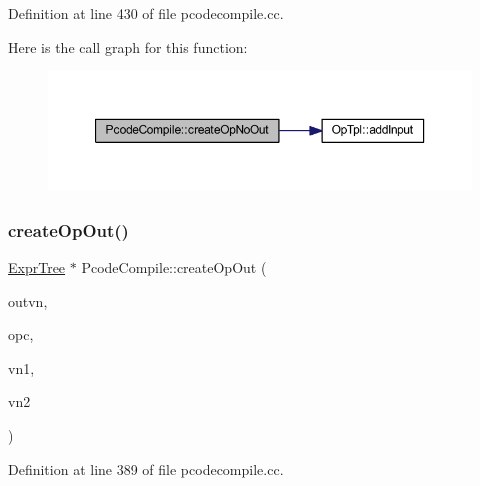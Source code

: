 Definition at line 430 of file pcodecompile.\+cc.

Here is the call graph for this function\+:
\nopagebreak
\begin{figure}[H]
\begin{center}
\leavevmode
\includegraphics[width=350pt]{class_pcode_compile_aa8af8519a707c8922ad4eda925a6500e_cgraph}
\end{center}
\end{figure}
\mbox{\label{class_pcode_compile_ae446c23b3e9630fe67512e572dcfbb73}} 
\subsubsection{\texorpdfstring{createOpOut()}{createOpOut()}}
{\footnotesize\ttfamily \mbox{\hyperlink{class_expr_tree}{Expr\+Tree}} $\ast$ Pcode\+Compile\+::create\+Op\+Out (\begin{DoxyParamCaption}\item[{\mbox{\hyperlink{class_varnode_tpl}{Varnode\+Tpl}} $\ast$}]{outvn,  }\item[{\mbox{\hyperlink{opcodes_8hh_abeb7dfb0e9e2b3114e240a405d046ea7}{Op\+Code}}}]{opc,  }\item[{\mbox{\hyperlink{class_expr_tree}{Expr\+Tree}} $\ast$}]{vn1,  }\item[{\mbox{\hyperlink{class_expr_tree}{Expr\+Tree}} $\ast$}]{vn2 }\end{DoxyParamCaption})}



Definition at line 389 of file pcodecompile.\+cc.


